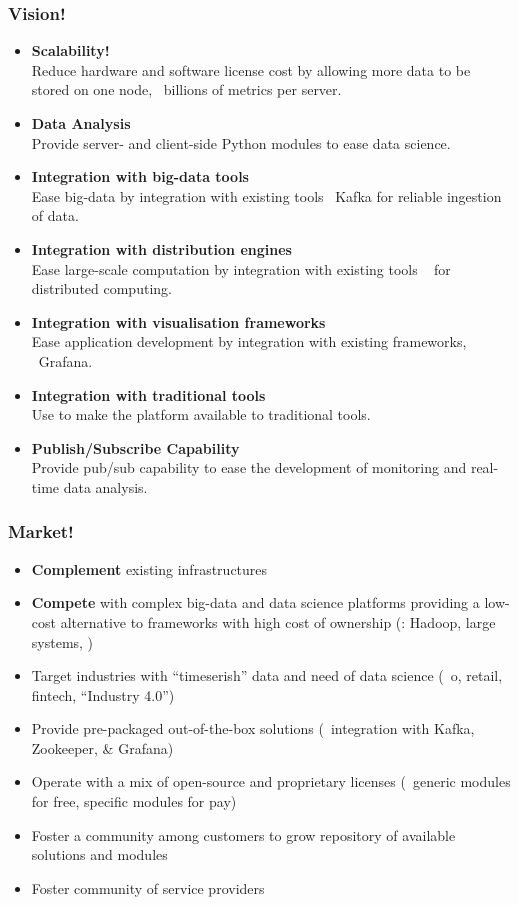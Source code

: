 \documentclass[mathserif]{beamer}
\begin{document}
\begin{frame}[shrink]
\frametitle{Vision!}
\begin{itemize}
\item \textbf{Scalability!}\\
      Reduce hardware and software license cost
      by allowing more data to be stored on one node,
      \ie\ billions of metrics per server.
\item \textbf{Data Analysis}\\
      Provide server- and client-side Python modules
      to ease data science.
\item \textbf{Integration with big-data tools}\\
      Ease big-data by integration with existing tools
      \eg\ Kafka for reliable ingestion of data.
\item \textbf{Integration with distribution engines}\\
      Ease large-scale computation by integration with existing tools
      \eg\  for distributed computing.
\item \textbf{Integration with visualisation frameworks}\\
      Ease application development by integration with existing
       frameworks, \eg\ Grafana.
\item \textbf{Integration with traditional tools}\\
      Use  to make the platform available
      to traditional tools.
\item \textbf{Publish/Subscribe Capability}\\
      Provide pub/sub capability to ease the development
      of monitoring and real-time data analysis.
\end{itemize}
\end{frame}

\begin{frame}
\frametitle{Market!}
\begin{itemize}
\item \textbf{Complement} existing  infrastructures
\item \textbf{Compete} with complex big-data and data science platforms
      providing a low-cost alternative 
      to frameworks with high cost of ownership
      (\eg: Hadoop, large  systems, \etc)
\item Target industries with ``timeserish'' data 
      and need of data science
      (\eg\ o, retail, fintech, ``Industry 4.0'')
\item Provide pre-packaged out-of-the-box solutions
      (\eg\ integration with Kafka, Zookeeper,  \& Grafana)
\item Operate with a mix of open-source and proprietary licenses
      (\eg\ generic modules for free, specific modules for pay)
\item Foster a community among customers to grow repository of
      available solutions and modules
\item Foster community of  service providers
\end{itemize}
\end{frame}
\end{document}
